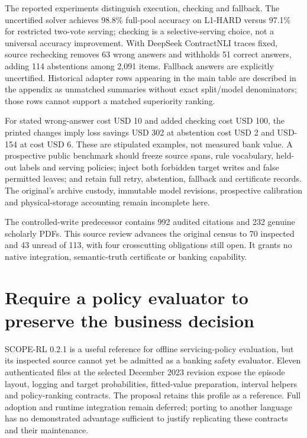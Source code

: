 The reported experiments distinguish execution, checking and fallback.
The uncertified solver achieves 98.8\% full-pool accuracy on L1-HARD
versus 97.1\% for restricted two-vote serving; checking is a
selective-serving choice, not a universal accuracy improvement. With
DeepSeek ContractNLI traces fixed, source rechecking removes 63 wrong
answers and withholds 51 correct answers, adding 114 abstentions among
2,091 items. Fallback answers are explicitly uncertified. Historical
adapter rows appearing in the main table are described in the appendix
as unmatched summaries without exact split/model denominators; those
rows cannot support a matched superiority ranking.
\citep{exec23_controlled_writes_paper,exec23_controlled_writes_reference}

For stated wrong-answer cost USD 10 and added checking cost USD 100, the
printed changes imply loss savings USD 302 at abstention cost USD 2 and
USD-154 at cost USD 6. These are stipulated examples, not measured bank
value. A prospective public benchmark should freeze source spans, rule
vocabulary, held-out labels and serving policies; inject both forbidden
target writes and false permitted leaves; and retain full retry,
abstention, fallback and certificate records. The original's archive
custody, immutable model revisions, prospective calibration and
physical-storage accounting remain incomplete here.
\citep{exec23_controlled_writes_paper,exec23_controlled_writes_reference}

The controlled-write predecessor contains 992 audited citations and 232
genuine scholarly PDFs. This source review advances the original census
to 70 inspected and 43 unread of 113, with four crosscutting obligations
still open. It grants no native integration, semantic-truth certificate
or banking capability.
\citep{sp23controlled_reader,sp23controlled_progress}

\hypertarget{require-a-policy-evaluator-to-preserve-the-business-decision}{%
\section{Require a policy evaluator to preserve the business
decision}\label{require-a-policy-evaluator-to-preserve-the-business-decision}}

SCOPE-RL 0.2.1 is a useful reference for offline servicing-policy
evaluation, but its inspected source cannot yet be admitted as a banking
safety evaluator. Eleven authenticated files at the selected December
2023 revision expose the episode layout, logging and target
probabilities, fitted-value preparation, interval helpers and
policy-ranking contracts. The proposal retains this profile as a
reference. Full adoption and runtime integration remain deferred;
porting to another language has no demonstrated advantage sufficient to
justify replicating these contracts and their maintenance.
\citep{exec23_scope_rl_sources}

